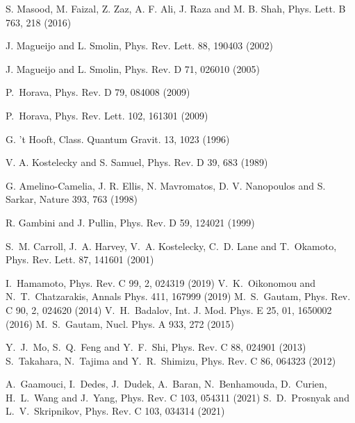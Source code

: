 \documentclass[12pt]{article}
\begin{document}
\begin{thebibliography}{99}
 S. Masood, M. Faizal, Z. Zaz, A. F. Ali, J. Raza and M. B. Shah, Phys. Lett. B 763, 218 (2016)  

 J.  Magueijo  and  L.  Smolin,  Phys.  Rev.  Lett. 88, 190403 (2002)   

 

 J.  Magueijo and  L.  Smolin,  Phys.  Rev.  D 71, 026010 (2005)  
 
 P.~Horava, Phys. Rev. D {79}, 084008 (2009) 

 P.~Horava, Phys. Rev. Lett. {102}, 161301 (2009) 

 G. 't Hooft, Class. Quantum Gravit. {13}, 1023 (1996) 

 V. A. Kostelecky and S. Samuel, Phys. Rev. D {39}, 683 (1989) 

 G. Amelino-Camelia, J. R. Ellis, N. Mavromatos, D. V.
Nanopoulos and S. Sarkar, Nature {393}, 763 (1998) 

 R. Gambini and J. Pullin, Phys. Rev. D {59}, 124021 (1999) 

 S.~M. Carroll, J.~A. Harvey, V.~A. Kostelecky, C.~D. Lane
and T.~Okamoto, Phys. Rev. Lett. {87}, 141601 (2001)


I.~Hamamoto, Phys. Rev. C {99}, 2, 024319 (2019)
V.~K.~Oikonomou and N.~T.~Chatzarakis,
Annals Phys. {411}, 167999 (2019)
M.~S.~Gautam,
Phys. Rev. C  {90}, 2, 024620 (2014)
V.~H.~Badalov,
Int. J. Mod. Phys. E  {25},  01, 1650002 (2016)
M.~S.~Gautam,
Nucl. Phys. A {933}, 272 (2015)


  Y.~J.~Mo, S.~Q.~Feng and Y.~F.~Shi, Phys. Rev. C {88},  024901 (2013)
  S.~Takahara, N.~Tajima and Y.~R.~Shimizu, Phys. Rev. C {86}, 064323 (2012)
 
 A.~Gaamouci, I.~Dedes, J.~Dudek, A.~Baran, N.~Benhamouda, D.~Curien, H.~L.~Wang and J.~Yang, Phys. Rev. C  {103},  054311 (2021)
 S.~D.~Prosnyak and L.~V.~Skripnikov, Phys. Rev. C {103},  034314 (2021)



\end{thebibliography}
\end{document}
